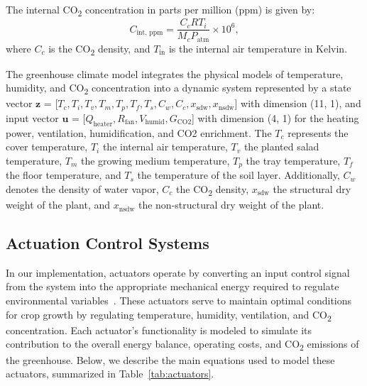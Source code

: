\documentclass[conference]{IEEEtran}
\begin{document}
The internal CO\textsubscript{2} concentration in parts per million (ppm) is given by:
\begin{equation}
    C_{\text{int, ppm}} = \frac{C_c  R  T_i}{M_c  P_{\text{atm}}} \times 10^6,
\end{equation}
where \(C_c\) is the CO\textsubscript{2} density, and \(T_{\text{in}}\) is the internal air temperature in Kelvin.

The greenhouse climate model integrates the physical models of temperature, humidity, and CO\textsubscript{2} concentration into a dynamic system represented by a state vector \(\mathbf{z}\) = [\(T_c, T_i, T_v, T_m, T_p, T_f, T_s, C_w, C_c, x_{\text{sdw}}, x_{\text{nsdw}}\)] with dimension (11, 1), and input vector \(\mathbf{u}\) = [\(Q_{\text{heater}}, R_{\text{fan}}, V_{\text{humid}}, G_{\text{CO2}} \)] with dimension (4, 1) for the heating power, ventilation, humidification, and CO2 enrichment. The \(T_c\) represents the cover temperature, \(T_i\) the internal air temperature, \(T_v\) the planted salad temperature, \(T_m\) the growing medium temperature, \(T_p\) the tray temperature, \(T_f\) the floor temperature, and \(T_s\) the temperature of the soil layer. Additionally, \(C_w\) denotes the density of water vapor, \(C_c\) the CO\textsubscript{2} density, \(x_{\text{sdw}}\) the structural dry weight of the plant, and \(x_{\text{nsdw}}\) the non-structural dry weight of the plant.

\subsection{Actuation Control Systems}
In our implementation, actuators operate by converting an input control signal from the system into the appropriate mechanical energy required to regulate environmental variables~\cite{Butterfield2018}. These actuators serve to maintain optimal conditions for crop growth by regulating temperature, humidity, ventilation, and CO\textsubscript{2} concentration. Each actuator's functionality is modeled to simulate its contribution to the overall energy balance, operating costs, and CO\textsubscript{2} emissions of the greenhouse. Below, we describe the main equations used to model these actuators, summarized in Table~\ref{tab:actuators}.
\end{document}

